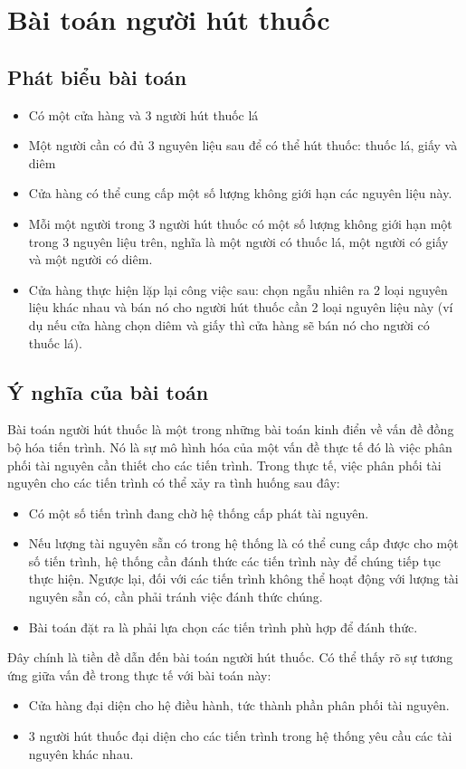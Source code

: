 \newpage
\section{Bài toán người hút thuốc}
\subsection{Phát biểu bài toán}
\begin{itemize}
	\item Có một cửa hàng và 3 người hút thuốc lá
	\item Một người cần có đủ 3 nguyên liệu sau để có thể hút thuốc: thuốc lá, giấy và diêm
	\item Cửa hàng có thể cung cấp một số lượng không giới hạn các nguyên liệu này.
	\item Mỗi một người trong 3 người hút thuốc có một số lượng không giới hạn một trong 3 nguyên liệu trên, nghĩa là một người có thuốc lá, một người có giấy và một người có diêm.
	\item Cửa hàng thực hiện lặp lại công việc sau: chọn ngẫu nhiên ra 2 loại nguyên liệu khác nhau và bán nó cho người hút thuốc cần 2 loại nguyên liệu này (ví dụ nếu cửa hàng chọn diêm và giấy thì cửa hàng sẽ bán nó cho người có thuốc lá).
\end{itemize}
\subsection{Ý nghĩa của bài toán}
Bài toán người hút thuốc là một trong những bài toán kinh điển về vấn đề đồng bộ hóa tiến trình. Nó là sự mô hình hóa của một vấn đề thực tế đó là việc phân phối tài nguyên cần thiết cho các tiến trình. Trong thực tế, việc phân phối tài nguyên cho các tiến trình có thể xảy ra tình huống sau đây:
\begin{itemize}
	\item Có một số tiến trình đang chờ hệ thống cấp phát tài nguyên.
	\item Nếu lượng tài nguyên sẵn có trong hệ thống là có thể cung cấp được cho một số tiến trình, hệ thống cần đánh thức các tiến trình này để chúng tiếp tục thực hiện. Ngược lại, đối với các tiến trình không thể hoạt động với lượng tài nguyên sẵn có, cần phải tránh việc đánh thức chúng.
	\item Bài toán đặt ra là phải lựa chọn các tiến trình phù hợp để đánh thức.
\end{itemize}
Đây chính là tiền đề dẫn đến bài toán người hút thuốc. Có thể thấy rõ sự tương ứng giữa vấn đề trong thực tế với bài toán này:
\begin{itemize}
	\item Cửa hàng đại diện cho hệ điều hành, tức thành phần phân phối tài nguyên.
	\item 3 người hút thuốc đại diện cho các tiến trình trong hệ thống yêu cầu các tài nguyên khác nhau.
\end{itemize}
